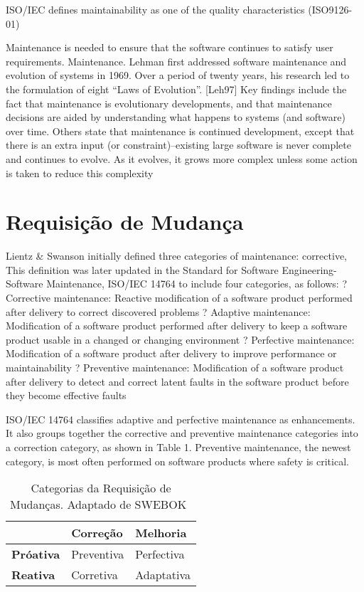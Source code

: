 ISO/IEC defines maintainability as one of the quality characteristics (ISO9126-01)

Maintenance is needed to ensure that the software continues
to satisfy user requirements. Maintenance. Lehman first addressed software maintenance and evolution of systems in 1969. Over a period of twenty years, his research led to the formulation of eight “Laws of Evolution”. [Leh97] Key findings
include the fact that maintenance is
evolutionary developments, and that
maintenance decisions are aided by understanding what happens to systems (and software) over time.
Others state that maintenance is continued development, except that there is
an extra input (or constraint)–existing large
software is never complete and continues to evolve. As it evolves, it grows more complex unless some
action is taken to reduce this complexity


\section{Requisição de Mudança}
\label{sec:requisição_de_mudanca}
Lientz \& Swanson initially defined three categories of maintenance: corrective,
This definition was later updated in the Standard for Software Engineering-Software Maintenance,
ISO/IEC 14764 to include four categories, as follows:
? Corrective maintenance: Reactive modification of a software product performed after delivery to
correct discovered problems
? Adaptive maintenance: Modification of a software product performed after delivery to keep a
software product
usable in a changed or changing environment
? Perfective maintenance: Modification of a software product after delivery to improve performance
or maintainability
? Preventive maintenance: Modification of a software product after delivery to detect and correct
latent
faults in the software product before they become effective faults


ISO/IEC 14764 classifies adaptive and perfective
maintenance as enhancements. It also groups together the corrective and preventive maintenance
categories into a correction category, as shown in Table 1.
Preventive
maintenance, the newest category, is most often performed on software products where safety is
critical.
\begin{table}[htpb]

	\centering
	\caption{Categorias da Requisição de Mudanças. Adaptado de SWEBOK~\cite{4425813}}
	\label{tab:categorias_requisicao_mudanca}
	\begin{tabular}{l|l|l|}
		\cline{2-3}
	 & \textbf{Correção} & \textbf{Melhoria} \\ \hline
	 \multicolumn{1}{|l|}{\textbf{Próativa}} & Preventiva & Perfectiva \\ \hline
	 \multicolumn{1}{|l|}{\textbf{Reativa}} & Corretiva & Adaptativa \\ \hline
	\end{tabular}
 \end{table} 

